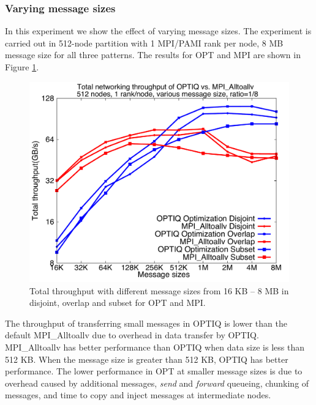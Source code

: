 \subsubsection{Varying message sizes}

In this experiment we show the effect of varying message sizes. The experiment is carried out in 512-node partition with 1 MPI/PAMI rank per node, 8 MB message size for all three patterns. The results for OPT and MPI are shown in Figure \ref{fig:messagesize}.
\begin{figure}[!htb]
\vspace{-0.15in}
\centering
\includegraphics[scale=0.27]{figures/messagesize.pdf}
\vspace{-0.15in}
\caption{Total throughput with different message sizes from 16 KB -- 8 MB in disjoint, overlap and subset for OPT and MPI.}
\vspace{-0.15in}
\label{fig:messagesize}
\end{figure}
The throughput of transferring small messages in OPTIQ is lower than the default MPI\_Alltoallv due to overhead in data transfer by OPTIQ. MPI\_Alltoallv has better performance than OPTIQ when data size is less than 512 KB. 
When the message size is greater than 512 KB, OPTIQ has better performance. The lower performance in OPT at smaller message sizes is due to overhead caused by additional messages, {\em send} and {\em forward} queueing, chunking of messages, and time to copy and inject messages at intermediate nodes.
